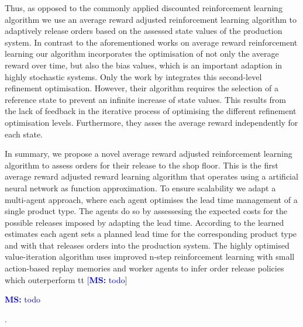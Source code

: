 \documentclass[envcountsame]{llncs}
\newcommand\MS[2][r]{\ifx t#1 \textcolor{blue}{[\textbf{MS:} #2]}
  \else \begin{center}\textcolor{blue}{\textbf{MS:} #2} \end{center} \fi}
\begin{document}
Thus, as opposed to the commonly applied discounted reinforcement learning algorithm we use an
average reward adjusted reinforcement learning algorithm to adaptively release orders based on the
assessed state values of the production system. In contrast to the aforementioned works on average
reward reinforcement learning our algorithm incorporates the optimisation of not only the average
reward over time, but also the bias values, which is an important adaption in highly stochastic
systems. Only the work by
\citet{Mahadevan96_AnAveragerewardReinforcementLearningAlgorithmForComputingBiasoptimalPolicies}
integrates this second-level refinement optimisation. However, their algorithm requires the
selection of a reference state to prevent an infinite increase of state values. This results from
the lack of feedback in the iterative process of optimising the different refinement optimisation
levels. Furthermore, they asses the average reward independently for each state.

In summary, we propose a novel average reward adjusted reinforcement learning algorithm to assess
orders for their release to the shop floor. This is the first average reward adjusted reward
learning algorithm that operates using a artificial neural network as function approximation. To
ensure scalability we adapt a multi-agent approach, where each agent optimises the lead time
management of a single product type. The agents do so by assessesing the expected costs for the
possible releases imposed by adapting the lead time. According to the learned estimates each agent
sets a planned lead time for the corresponding product type and with that releases orders into the
production system. The highly optimised value-iteration algorithm uses improved n-step reinforcement
learning with small action-based replay memories and worker agents to infer order release policies
which outerperform \MS[t]{todo}.

%
\end{document}
